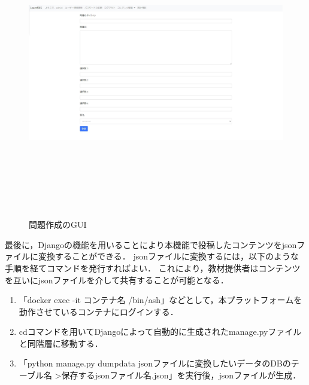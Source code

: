 \begin{figure}[htbp]
    \begin{center}
        \includegraphics[width=13cm,height=12cm,keepaspectratio]{create_question-crop.pdf}\\
    \end{center}
    \caption{問題作成のGUI}
    \label{create_question}
\end{figure}

最後に，Djangoの機能を用いることにより本機能で投稿したコンテンツをjsonファイルに変換することができる．
jsonファイルに変換するには，以下のような手順を経てコマンドを発行すればよい．
これにより，教材提供者はコンテンツを互いにjsonファイルを介して共有することが可能となる．

\begin{enumerate}
    \item 「docker exec -it コンテナ名 /bin/ash」などとして，本プラットフォームを動作させているコンテナにログインする．
    \item cdコマンドを用いてDjangoによって自動的に生成されたmanage.pyファイルと同階層に移動する．
    \item 「python manage.py dumpdata jsonファイルに変換したいデータのDBのテーブル名 \textgreater 保存するjsonファイル名.json」を実行後，jsonファイルが生成．
\end{enumerate}